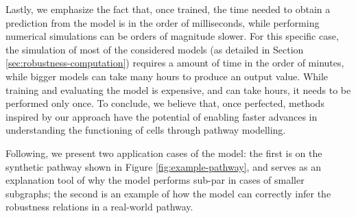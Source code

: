 Lastly, we emphasize the fact that, once trained, the time needed to obtain a prediction from the model is in the order of milliseconds, while performing numerical simulations can be orders of magnitude slower. For this specific case, the simulation of most of the considered models (as detailed in Section \ref{sec:robustness-computation}) requires a amount of time in the order of minutes, while bigger models can take many hours to produce an output value. While training and evaluating the model is expensive, and can take hours, it needs to be performed only once. To conclude, we believe that, once perfected, methods inspired by our approach have the potential of enabling faster advances in understanding the functioning of cells through pathway modelling.

Following, we present two application cases of the model: the first is on the synthetic pathway shown in Figure \ref{fig:example-pathway}, and serves as an explanation tool of why the model performs sub-par in cases of smaller subgraphs; the second is an example of how the model can correctly infer the robustness relations in a real-world pathway.

